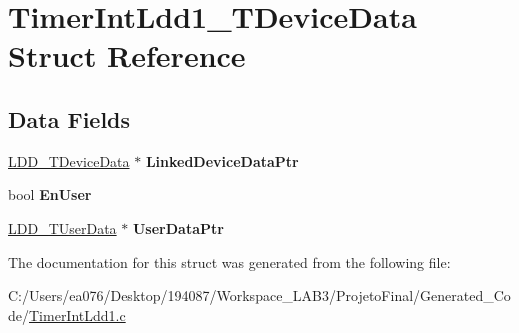 \hypertarget{struct_timer_int_ldd1___t_device_data}{\section{Timer\-Int\-Ldd1\-\_\-\-T\-Device\-Data Struct Reference}
\label{struct_timer_int_ldd1___t_device_data}
}
\subsection*{Data Fields}
\begin{DoxyCompactItemize}
\item 
\hypertarget{struct_timer_int_ldd1___t_device_data_a00c04d809c08f8d1a5e0a0f5aaee94d9}{\hyperlink{group___p_e___types__module_gac5cf1362f1f0e3a2ce71b1bf2276d091}{L\-D\-D\-\_\-\-T\-Device\-Data} $\ast$ {\bfseries Linked\-Device\-Data\-Ptr}}\label{struct_timer_int_ldd1___t_device_data_a00c04d809c08f8d1a5e0a0f5aaee94d9}

\item 
\hypertarget{struct_timer_int_ldd1___t_device_data_ad3f66f696819617171b0a89842a72e93}{bool {\bfseries En\-User}}\label{struct_timer_int_ldd1___t_device_data_ad3f66f696819617171b0a89842a72e93}

\item 
\hypertarget{struct_timer_int_ldd1___t_device_data_ac8d630b624b953cb570ae524bb618389}{\hyperlink{group___p_e___types__module_ga0b66a73f87238a782318aa0be7578e35}{L\-D\-D\-\_\-\-T\-User\-Data} $\ast$ {\bfseries User\-Data\-Ptr}}\label{struct_timer_int_ldd1___t_device_data_ac8d630b624b953cb570ae524bb618389}

\end{DoxyCompactItemize}


The documentation for this struct was generated from the following file\-:\begin{DoxyCompactItemize}
\item 
C\-:/\-Users/ea076/\-Desktop/194087/\-Workspace\-\_\-\-L\-A\-B3/\-Projeto\-Final/\-Generated\-\_\-\-Code/\hyperlink{_timer_int_ldd1_8c}{Timer\-Int\-Ldd1.\-c}\end{DoxyCompactItemize}
